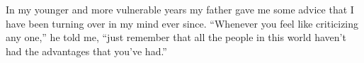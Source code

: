 \begin{jabstract}
In my younger and more vulnerable years my father gave me some advice that I have been turning over in my mind ever since.
“Whenever you feel like criticizing any one,” he told me, “just remember that all the people in this world haven't had the advantages that you've had.”
\end{jabstract}
